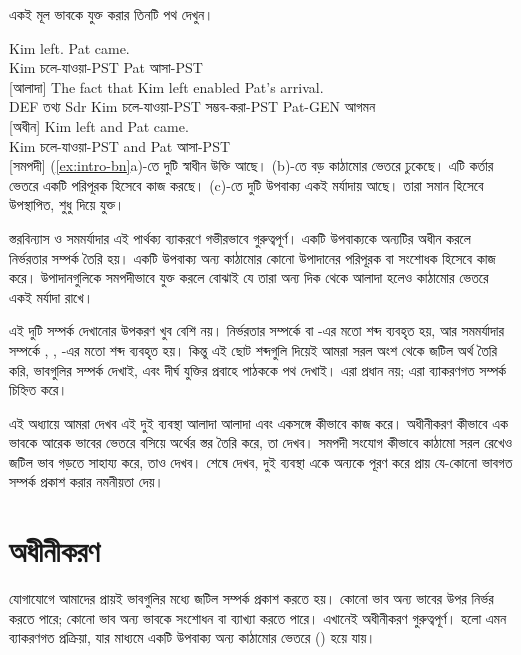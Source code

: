 একই মূল ভাবকে যুক্ত করার তিনটি পথ দেখুন।

\ea \label{ex:intro-bn}
    \ea \gll Kim left. Pat came.\\
        Kim চলে-যাওয়া-PST Pat আসা-PST\\
    \glt {} [আলাদা]
    \ex \gll The fact {\ob}that Kim left{\cb} enabled Pat's arrival.\\
        DEF তথ্য Sdr Kim চলে-যাওয়া-PST সম্ভব-করা-PST Pat-GEN আগমন\\
    \glt {} [অধীন]
    \ex \gll Kim left and Pat came.\\
        Kim চলে-যাওয়া-PST and Pat আসা-PST\\
    \glt {} [সমপদী]
    \z
\z
(\ref{ex:intro-bn}a)-তে দুটি স্বাধীন উক্তি আছে। (b)-তে  বড় কাঠামোর ভেতরে ঢুকেছে। এটি কর্তার ভেতরে একটি পরিপূরক হিসেবে কাজ করছে। (c)-তে দুটি উপবাক্য একই মর্যাদায় আছে। তারা সমান হিসেবে উপস্থাপিত, শুধু  দিয়ে যুক্ত।

স্তরবিন্যাস ও সমমর্যাদার এই পার্থক্য ব্যাকরণে গভীরভাবে গুরুত্বপূর্ণ। একটি উপবাক্যকে অন্যটির অধীন করলে নির্ভরতার সম্পর্ক তৈরি হয়। একটি উপবাক্য অন্য কাঠামোর কোনো উপাদানের পরিপূরক বা সংশোধক হিসেবে কাজ করে। উপাদানগুলিকে সমপদীভাবে যুক্ত করলে বোঝাই যে তারা অন্য দিক থেকে আলাদা হলেও কাঠামোর ভেতরে একই মর্যাদা রাখে।

এই দুটি সম্পর্ক দেখানোর উপকরণ খুব বেশি নয়। নির্ভরতার সম্পর্কে  বা -এর মতো শব্দ ব্যবহৃত হয়, আর সমমর্যাদার সম্পর্কে , , -এর মতো শব্দ ব্যবহৃত হয়। কিন্তু এই ছোট শব্দগুলি দিয়েই আমরা সরল অংশ থেকে জটিল অর্থ তৈরি করি, ভাবগুলির সম্পর্ক দেখাই, এবং দীর্ঘ যুক্তির প্রবাহে পাঠককে পথ দেখাই। এরা প্রধান নয়; এরা ব্যাকরণগত সম্পর্ক চিহ্নিত করে।

এই অধ্যায়ে আমরা দেখব এই দুই ব্যবস্থা আলাদা আলাদা এবং একসঙ্গে কীভাবে কাজ করে। অধীনীকরণ কীভাবে এক ভাবকে আরেক ভাবের ভেতরে বসিয়ে অর্থের স্তর তৈরি করে, তা দেখব। সমপদী সংযোগ কীভাবে কাঠামো সরল রেখেও জটিল ভাব গড়তে সাহায্য করে, তাও দেখব। শেষে দেখব, দুই ব্যবস্থা একে অন্যকে পূরণ করে প্রায় যে-কোনো ভাবগত সম্পর্ক প্রকাশ করার নমনীয়তা দেয়।

\section{অধীনীকরণ}\label{sec:subordination-bn}

যোগাযোগে আমাদের প্রায়ই ভাবগুলির মধ্যে জটিল সম্পর্ক প্রকাশ করতে হয়। কোনো ভাব অন্য ভাবের উপর নির্ভর করতে পারে; কোনো ভাব অন্য ভাবকে সংশোধন বা ব্যাখ্যা করতে পারে। এখানেই অধীনীকরণ গুরুত্বপূর্ণ।  হলো এমন ব্যাকরণগত প্রক্রিয়া, যার মাধ্যমে একটি উপবাক্য অন্য কাঠামোর ভেতরে  () হয়ে যায়।

